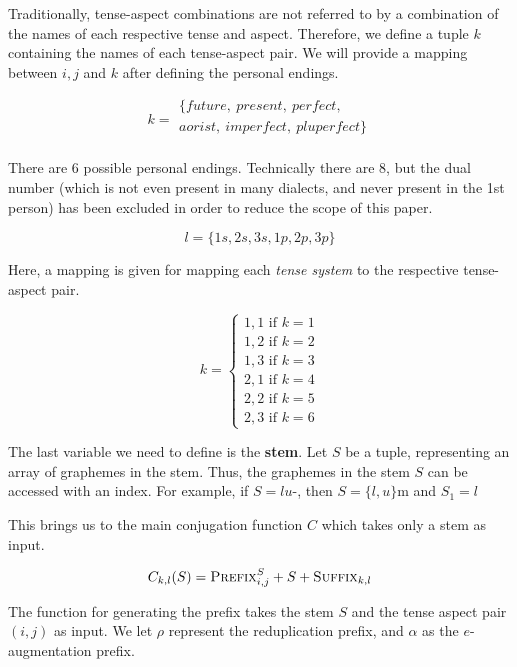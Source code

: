 \documentclass[12pt]{article}
\begin{document}
Traditionally, tense-aspect combinations are not referred to by a combination
of the names of each respective tense and aspect. Therefore, we define a tuple
$k$ containing the names of each tense-aspect pair. We will provide a mapping between
$i,j$ and $k$ after defining the personal endings.

\[k = \begin{array}{c}
          \{future,\ present,\ perfect,\\
          aorist,\ imperfect,\ pluperfect\}\\
      \end{array}\]

There are 6 possible personal endings. Technically there are 8, 
but the dual number (which is not even present in many dialects,
and never present in the 1st person) has been excluded in order
to reduce the scope of this paper.
      
\[l = \{1s,2s,3s,1p,2p,3p\}\]

Here, a mapping is given for mapping each \emph{tense system} to the respective
tense-aspect pair.

\[
    k = \begin{cases}
            1,1\text{ if }k = 1\\
            1,2\text{ if }k = 2\\
            1,3\text{ if }k = 3\\
            2,1\text{ if }k = 4\\
            2,2\text{ if }k = 5\\
            2,3\text{ if }k = 6
        \end{cases}
\]

The last variable we need to define is the \textbf{stem}. Let $S$ be a tuple,
representing an array of graphemes in the stem. Thus, the graphemes in the stem
$S$ can be accessed with an index. For example, if $S = lu\text{-}$, then $S =
\{l, u\}$m and $S_1
= l$ 

This brings us to the main conjugation function $C$ which takes only a stem as
input.

\begin{equation}
    C_{k,l}(S) = \textsc{Prefix}^{S}_{i,j}+S+\textsc{Suffix}_{k,l}
\end{equation}

The function for generating the prefix takes the stem $S$ and the 
tense aspect pair $(i,j)$ as input. We let $\rho$ represent the
reduplication prefix, and $\alpha$ as the $e$-augmentation prefix.
\end{document}
